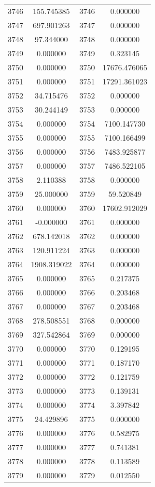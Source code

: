 \documentclass[12pt]{article}
\begin{document}
\begin{longtable}{@{}cccc@{}}
3746 & 155.745385 & 3746 & 0.000000 \\
3747 & 697.901263 & 3747 & 0.000000 \\
3748 & 97.344000 & 3748 & 0.000000 \\
3749 & 0.000000 & 3749 & 0.323145 \\
3750 & 0.000000 & 3750 & 17676.476065 \\
3751 & 0.000000 & 3751 & 17291.361023 \\
3752 & 34.715476 & 3752 & 0.000000 \\
3753 & 30.244149 & 3753 & 0.000000 \\
3754 & 0.000000 & 3754 & 7100.147730 \\
3755 & 0.000000 & 3755 & 7100.166499 \\
3756 & 0.000000 & 3756 & 7483.925877 \\
3757 & 0.000000 & 3757 & 7486.522105 \\
3758 & 2.110388 & 3758 & 0.000000 \\
3759 & 25.000000 & 3759 & 59.520849 \\
3760 & 0.000000 & 3760 & 17602.912029 \\
3761 & -0.000000 & 3761 & 0.000000 \\
3762 & 678.142018 & 3762 & 0.000000 \\
3763 & 120.911224 & 3763 & 0.000000 \\
3764 & 1908.319022 & 3764 & 0.000000 \\
3765 & 0.000000 & 3765 & 0.217375 \\
3766 & 0.000000 & 3766 & 0.203468 \\
3767 & 0.000000 & 3767 & 0.203468 \\
3768 & 278.508551 & 3768 & 0.000000 \\
3769 & 327.542864 & 3769 & 0.000000 \\
3770 & 0.000000 & 3770 & 0.129195 \\
3771 & 0.000000 & 3771 & 0.187170 \\
3772 & 0.000000 & 3772 & 0.121759 \\
3773 & 0.000000 & 3773 & 0.139131 \\
3774 & 0.000000 & 3774 & 3.397842 \\
3775 & 24.429896 & 3775 & 0.000000 \\
3776 & 0.000000 & 3776 & 0.582975 \\
3777 & 0.000000 & 3777 & 0.741381 \\
3778 & 0.000000 & 3778 & 0.113589 \\
3779 & 0.000000 & 3779 & 0.012550 \\

\end{longtable}
\end{document}
